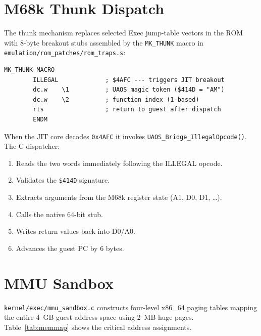 \documentclass[11pt,a4paper]{report}
\begin{document}
\section{M68k Thunk Dispatch}

The thunk mechanism replaces selected Exec jump-table vectors in the ROM
with 8-byte breakout stubs assembled by the \texttt{MK\_THUNK} macro in
\texttt{emulation/rom\_patches/rom\_traps.s}:

\begin{lstlisting}[language={[Motorola68k]Assembler}, caption={MK\_THUNK macro}]
MK_THUNK MACRO
        ILLEGAL             ; $4AFC --- triggers JIT breakout
        dc.w    \1          ; UAOS magic token ($414D = "AM")
        dc.w    \2          ; function index (1-based)
        rts                 ; return to guest after dispatch
        ENDM
\end{lstlisting}

When the JIT core decodes \texttt{0x4AFC} it invokes
\texttt{UAOS\_Bridge\_IllegalOpcode()}.  The C dispatcher:
\begin{enumerate}
    \item Reads the two words immediately following the ILLEGAL opcode.
    \item Validates the \texttt{\$414D} signature.
    \item Extracts arguments from the M68k register state (A1, D0, D1, \ldots).
    \item Calls the native 64-bit stub.
    \item Writes return values back into D0/A0.
    \item Advances the guest PC by 6 bytes.
\end{enumerate}

\section{MMU Sandbox}

\texttt{kernel/exec/mmu\_sandbox.c} constructs four-level x86\_64 paging
tables mapping the entire 4~GB guest address space using 2~MB huge pages.
Table~\ref{tab:memmap} shows the critical address assignments.
\end{document}
